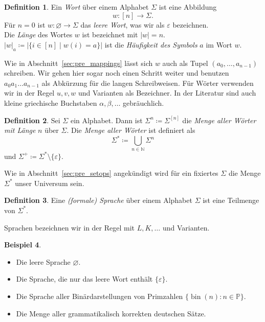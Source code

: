 \documentclass[11pt, a4paper]{article}
\theoremstyle{definition}
\newtheorem{definition}{Definition}[section]
\newtheorem{example}[definition]{Beispiel}
\theoremstyle{plain}
\numberwithin{equation}{section}
\DeclareMathOperator{\bin}{bin}
\let\emptyset\varnothing
\begin{document}
\begin{definition}
	Ein \textit{Wort} über einem Alphabet \( \Sigma \) ist eine Abbildung
	\[
		w\colon [n] \to \Sigma.
	\]
	Für \( n = 0 \) ist \( w\colon \emptyset \to \Sigma \) das \textit{leere Wort}, was wir als \( \varepsilon \) bezeichnen.\\
	Die \textit{Länge} des Wortes \( w \) ist bezeichnet mit \( \left| w \right| = n \).\\
	\( \left| w \right|_a \coloneqq \left| \{ i \in [n] \mid w(i) = a \} \right| \) ist die \textit{Häufigkeit des Symbols} \( a \) im Wort \( w \).
\end{definition}
Wie in Abschnitt~\ref{sec:pre_mappings} lässt sich \( w \) auch als Tupel \( (a_0, \ldots, a_{n-1}) \) schreiben. Wir gehen hier sogar noch einen Schritt weiter und benutzen \( a_0 a_1 \ldots a_{n-1} \) als Abkürzung für die langen Schreibweisen. Für Wörter verwenden wir in der Regel \( u, v, w \) und Varianten als Bezeichner. In der Literatur sind auch kleine griechische Buchstaben \( \alpha, \beta, \ldots \) gebräuchlich.
\begin{definition}
	Sei \( \Sigma \) ein Alphabet. Dann ist \( \Sigma^n \coloneqq \Sigma^{[n]} \) die \textit{Menge aller Wörter mit Länge} \( n \) über \( \Sigma \).
	Die \textit{Menge aller Wörter} ist definiert als
	\[
		\Sigma^\ast \coloneqq \bigcup_{n \in \mathbb{N}} \Sigma^n
	\]
	und \( \Sigma^+ \coloneqq \Sigma^\ast \setminus \{ \varepsilon \} \).
\end{definition}
Wie in Abschnitt~\ref{sec:pre_setops} angekündigt wird für ein fixiertes \( \Sigma \) die Menge \( \Sigma^\ast \) unser Universum sein.
\begin{definition}
	Eine \textit{(formale) Sprache} über einem Alphabet \( \Sigma \) ist eine Teilmenge von \( \Sigma^\ast \).
\end{definition}
Sprachen bezeichnen wir in der Regel mit \( L, K, \ldots \) und Varianten.
\begin{example}
	\
	\begin{itemize}
		\item Die leere Sprache \( \emptyset \).
		\item Die Sprache, die nur das leere Wort enthält \( \{ \varepsilon \} \).
		\item Die Sprache aller Binärdarstellungen von Primzahlen \( \{ \bin(n) : n \in \mathbb{P} \} \).
		\item Die Menge aller grammatikalisch korrekten deutschen Sätze.
	\end{itemize}
\end{example}
\end{document}
